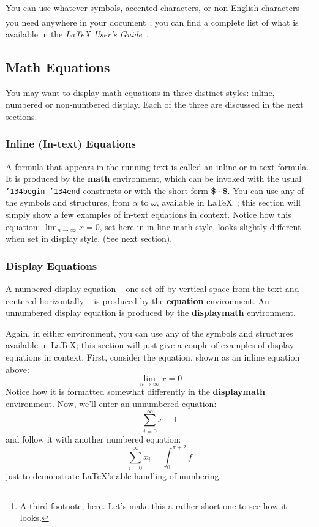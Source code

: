 \documentclass[article,english]{stucosrec}
\newcommand{\latex}{\LaTeX\xspace}
\begin{document}
	You can use whatever symbols, accented characters, or non-English characters you need anywhere in your document\footnote{A third footnote, here. Let's make this a rather short one to see how it looks.}; you can find a complete list of what is available in the \textit{\latex
	User's Guide}~\cite{Lamport:LaTeX}.
	
	\subsection{Math Equations}
	
	You may want to display math equations in three distinct styles:
	inline, numbered or non-numbered display.  Each of
	the three are discussed in the next sections.
	
	\subsubsection{Inline (In-text) Equations}
	
	A formula that appears in the running text is called an inline or in-text formula.
	It is produced by the \textbf{math} environment, which can be invoked with the usual \texttt{{\char'134}begin {\char'134}end} constructs or with the short form \textbf{\$$\cdots$\$}.
	You can use any of the symbols and structures, from $\alpha$ to $\omega$, available in \latex~\cite{Lamport:LaTeX}; this section will simply show a few examples of in-text equations in context.
	Notice how this equation: 
	\begin{math}\lim_{n\rightarrow \infty}x=0\end{math}, 
	set here in in-line math style, looks slightly different when set in display style.
	(See next section).
	
	\subsubsection{Display Equations}
	
	A numbered display equation -- one set off by vertical space from the text and centered horizontally -- is produced by the \textbf{equation} environment.
	An unnumbered display equation is produced by the \textbf{displaymath} environment.
	
	Again, in either environment, you can use any of the symbols and structures available in \latex; this section will just give a couple of examples of display equations in context.
	First, consider the equation, shown as an inline equation above:
	\begin{equation}\lim_{n\rightarrow \infty}x=0\end{equation}
	Notice how it is formatted somewhat differently in the \textbf{displaymath} environment.
	Now, we'll enter an unnumbered equation:
	\begin{displaymath}\sum_{i=0}^{\infty} x + 1\end{displaymath}
	and follow it with another numbered equation:
	\begin{equation}\sum_{i=0}^{\infty}x_i=\int_{0}^{\pi+2} f\end{equation}
	just to demonstrate \latex's able handling of numbering.
	
\end{document}
